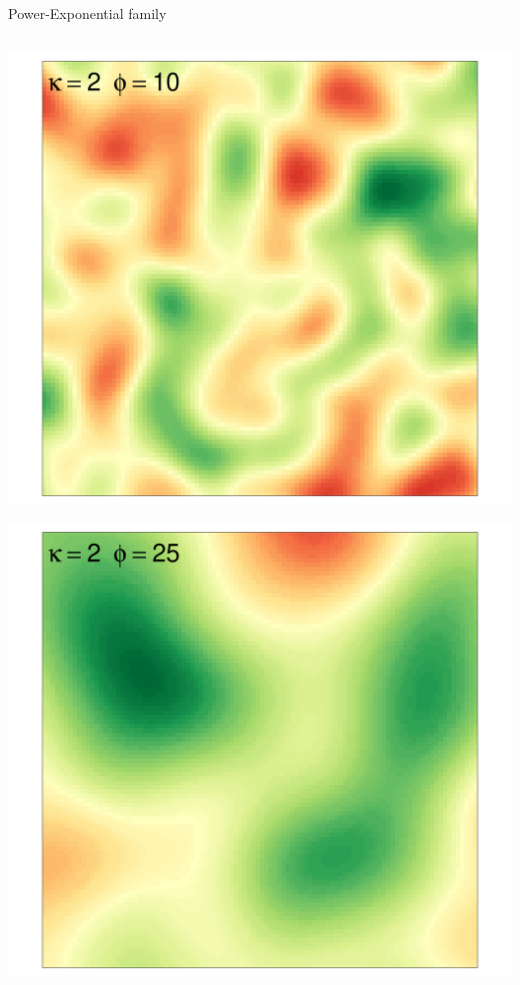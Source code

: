 \documentclass[
  ignorenonframetext,
]{beamer}
\begin{document}
\begin{frame}{Power-Exponential family}
\begin{columns}[T]
\begin{column}{0.33\textwidth}
\includegraphics{Lecture_1_files/figure-beamer/unnamed-chunk-20-1.pdf}

\includegraphics{Lecture_1_files/figure-beamer/unnamed-chunk-21-1.pdf}
\end{column}


\end{columns}
\end{frame}
\end{document}
